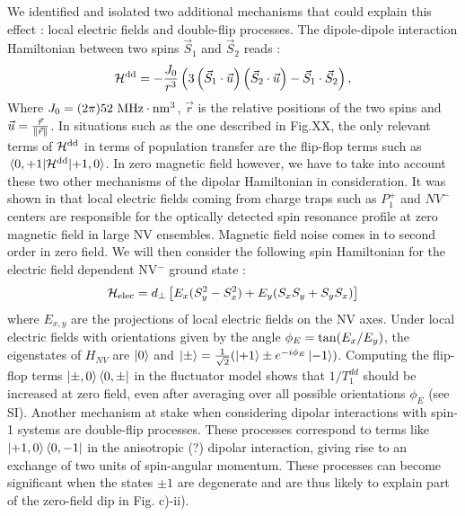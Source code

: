 \documentclass[preprintnumbers,amsmath,amssymb,superscriptaddress,twocolumn,showpacs]{revtex4-2}
\begin{document}
We identified and isolated two additional mechanisms that could explain this effect : local electric fields and double-flip processes. 
The dipole-dipole interaction Hamiltonian between two spins ${\vec S}_1$ and ${\vec S}_2$ reads :
\begin{equation}
\mathcal{H}^{\rm dd}= -\frac{J_0}{r^3}\left(3\left({\vec S}_1 \cdot \vec u \right)\left({\vec S}_2 \cdot \vec u \right) - {\vec S}_1 \cdot {\vec S}_2  \right),
\end{equation}
Where $J_0= (2 \pi) 52\ \rm MHz \cdot \rm{nm}^3$, $\vec r$ is the relative positions of the two spins and $\vec u = \frac{\vec r}{\norm{\vec r}}$. In situations such as the one described in Fig.XX, the only relevant terms of $\mathcal{H}^{\rm dd}$ in terms of population transfer are the flip-flop terms such as $\mel{0,+1}{\mathcal{H}^{\rm dd}}{+1,0}$. In zero magnetic field however, we have to take into account these two other mechanisms of the dipolar Hamiltonian in consideration.
It was shown in  \cite{mittiga2018imaging} that local electric fields coming from charge traps such as $P_1^+$ and $NV^-$ centers are responsible for the optically detected spin resonance profile at zero magnetic field in large NV ensembles. Magnetic field noise comes in to second order in zero field. %
We will then consider the following spin Hamiltonian for the electric field dependent NV$^-$ ground state : 
\begin{equation}
\label{NV Hamiltonian}
\mathcal{H}_{\rm elec}= d_\perp \left[ E_x(S_y^2-S_x^2) + E_y(S_xS_y+S_yS_x) \right]
\end{equation}
where $E_{x,y}$ are the projections of local electric fields on the NV axes. 
Under local electric fields with orientations given by the angle $\phi_E={\rm tan}(E_x/E_y)$, the eigenstates of $H_{NV}$ are $\ket{0}$ and $\ket{\pm}=\frac{1}{\sqrt{2}}(\ket{+1}\pm e^{-i\phi_E}\ket{-1})$.
Computing the flip-flop terms $\ket{\pm,0} \bra{0,\pm} $ in the fluctuator model shows that $1/T_1^{dd}$ should be increased at zero field, even after averaging over all possible orientations $\phi_E$ (see SI).  Another mechanism at stake when considering dipolar interactions with spin-1 systems are double-flip processes. 
These processes correspond to terms like $\ket{+1,0} \bra{0,-1}$ in the anisotropic (?) dipolar interaction, giving rise to an exchange of two units of spin-angular momentum. These processes can become significant when the states $\pm 1$ are degenerate and are thus likely to explain part of the zero-field dip in Fig. c)-ii). 
\end{document}
